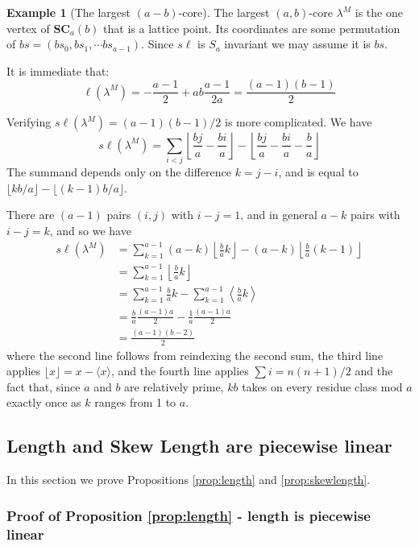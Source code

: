 \documentclass{amsart}[12pt]
\theoremstyle{definition}
\newtheorem{example}[dummy]{Example}
\newcommand{\SC}{\mathbf{SC}}
\newcommand{\sk}{s\ell}
\begin{document}
\begin{example}[The largest $(a-b)$-core]

The largest $(a,b)$-core $\lambda^M$ is the one vertex of $\SC_a(b)$ that is a lattice point.  Its coordinates are some permutation of
$bs=(bs_0,bs_1,\cdots bs_{a-1})$. Since $\sk$ is $S_a$ invariant we may assume it is $bs$.  

It is immediate that:
$$\ell(\lambda^M)=-\frac{a-1}{2}+ab\frac{a-1}{2a}=\frac{(a-1)(b-1)}{2}$$

Verifying $\sk(\lambda^M)=(a-1)(b-1)/2$ is more complicated.  We have 
$$\sk(\lambda^M)=\sum_{i<j} \left\lfloor \frac{bj}{a}-\frac{bi}{a}\right\rfloor
-\left\lfloor \frac{bj}{a}-\frac{bi}{a}-\frac{b}{a}\right\rfloor$$
The summand depends only on the difference $k=j-i$, and is equal to $\lfloor kb/a\rfloor-\lfloor(k-1)b/a\rfloor$.

There are $(a-1)$ pairs $(i,j)$ with $i-j=1$, and in general $a-k$ pairs with $i-j=k$, and so we have
\begin{align*}
\sk(\lambda^M) &=\sum_{k=1}^{a-1}(a-k)\left\lfloor \frac{b}{a} k\right\rfloor-(a-k)\left\lfloor\frac{b}{a}(k-1)\right\rfloor \\
&=\sum_{k=1}^{a-1} \left\lfloor \frac{b}{a} k\right\rfloor \\
&=\sum_{k=1}^{a-1} \frac{b}{a}k-\sum_{k=1}^{a-1}\left\langle \frac{b}{a}k\right\rangle \\
&=\frac{b}{a} \frac{(a-1)a}{2}-\frac{1}{a}\frac{(a-1)a}{2} \\
&=\frac{(a-1)(b-2)}{2}
\end{align*}
where the second line follows from reindexing the second sum, the third line applies $\lfloor x\rfloor=x-\langle x\rangle$, and the fourth line applies $\sum i=n(n+1)/2$ and the fact that, since $a$ and $b$ are relatively prime, $kb$ takes on every residue class mod $a$ exactly once as $k$ ranges from 1 to $a$.

\end{example}


\subsection{Length and Skew Length are piecewise linear}
In this section we prove Propositions \ref{prop:length} and \ref{prop:skewlength}.

\subsubsection{Proof of Proposition \ref{prop:length} - length is piecewise linear} 
\end{document}

